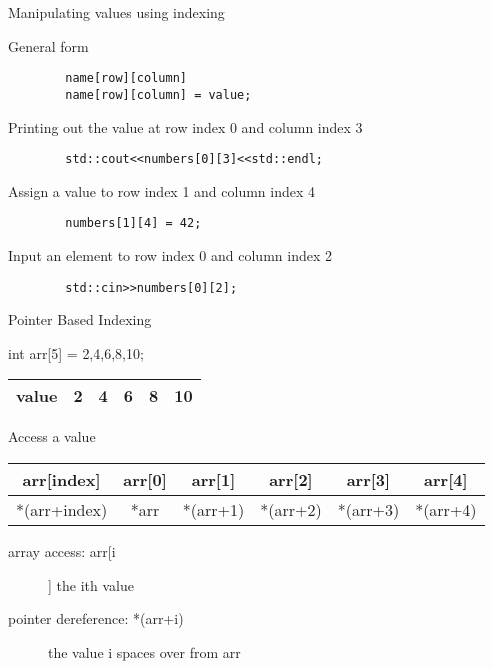 \documentclass[xcolor={dvipsnames}]{beamer}
\begin{document}
\begin{frame}[fragile]{Manipulating values using indexing}
	\begin{block}{General form}
	\begin{verbatim}
		name[row][column]
		name[row][column] = value;
	\end{verbatim}
	\end{block}
	\pause
	\begin{block}{Printing out the value at row index 0 and column index 3}
	\begin{verbatim}
		std::cout<<numbers[0][3]<<std::endl;
	\end{verbatim}
	\end{block}
	\pause
	\begin{block}{Assign a value to row index 1 and column index 4}
	\begin{verbatim}
		numbers[1][4] = 42;
	\end{verbatim}
	\end{block}
	\pause
	\begin{block}{Input an element to row index 0 and column index 2}
	\begin{verbatim}
		std::cin>>numbers[0][2];
	\end{verbatim}
	\end{block}
\end{frame}

\begin{frame}[fragile]{Pointer Based Indexing}
\begin{block}{int arr[5] = {2,4,6,8,10};}
	\begin{table}
	\Huge
	\begin{tabular}{|c|c|c|c|c|c|}
	\hline
	value & 2  & 4 & 6 & 8 & 10\\
	\hline
	\end{tabular}
\end{table}
\end{block}
\begin{block}{Access a value}
	\begin{table}
	\begin{tabular}{|c|c|c|c|c|c|}
	\hline
	arr[index]  & arr[0]  & arr[1] & arr[2] & arr[3] & arr[4]\\
	\hline
        *(arr+index) & *arr & *(arr+1) & *(arr+2) & *(arr+3) & *(arr+4)\\
	\hline
	\end{tabular}
\end{table}
\begin{description}
	\item[array access: arr[i]] the ith value 
	\item[pointer dereference: *(arr+i)] the value i spaces over from arr
\end{description}
\end{block}
\end{frame}
\end{document}

